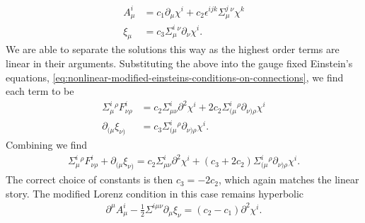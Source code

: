 \documentclass[10pt]{report}
\theoremstyle{definition}
\begin{document}
        \begin{align}
            A^i_\mu & = c_1 \partial_\mu \chi^i + c_2 \epsilon^{ijk} \Sigma^j_\mu{}^\nu \chi^k \\ \xi_\mu & = c_3 \Sigma^i_\mu{}^\nu \partial_\nu \chi^i.
        \end{align}
        We are able to separate the solutions this way as the highest order terms are linear in their arguments. Substituting the above into the gauge fixed Einstein's equations, \cref{eq:nonlinear-modified-einsteins-conditions-on-connections}, we find each term to be 
        \begin{align}
            \Sigma^i_\mu{}^\rho F^i_{\nu \rho} & = c_2 \Sigma^i_{\mu\nu} \partial^2 \chi^i + 2c_2 \Sigma^i_{(\mu}{}^\rho \partial_{\nu)\rho} \chi^i \\
            \partial_{(\mu} \xi_{\nu)} & = c_3 \Sigma^i_{(\mu}{}^\rho \partial_{\nu)\rho} \chi^i.
        \end{align}
        Combining we find 
        \begin{align}
            \Sigma^i_\mu{}^\rho F^i_{\nu \rho} + \partial_{(\mu} \xi_{\nu)} = c_2 \Sigma^i_{\mu\nu} \partial^2 \chi^i + (c_3 + 2c_2) \Sigma^i_{(\mu}{}^\rho \partial_{\nu)\rho} \chi^i.
        \end{align}
        The correct choice of constants is then $c_3 = -2c_2$, which again matches the linear story. The modified Lorenz condition in this case remains hyperbolic
        \begin{align}
            \partial^\mu A^i_\mu - \frac{1}{2}\Sigma^{i\mu\nu} \partial_\mu \xi_\nu = (c_2 - c_1) \partial^2 \chi^i.
        \end{align}
    
\end{document}
